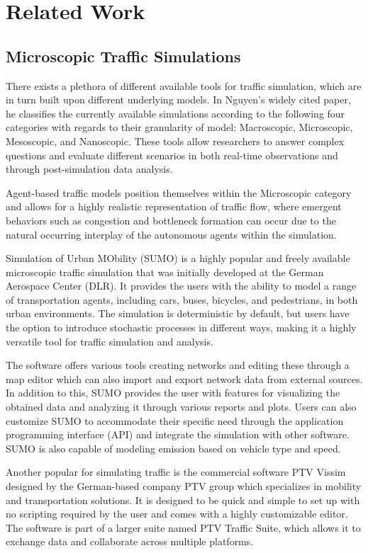 \section{Related Work} \label{Section_ref}
    \subsection{Microscopic Traffic Simulations}
        There exists a plethora of different available tools for traffic simulation, which are in turn built upon different underlying models. In Nguyen’s widely cited paper, he classifies the currently available simulations according to the following four categories with regards to their granularity of model: Macroscopic, Microscopic, Mesoscopic, and Nanoscopic. These tools allow researchers to answer complex questions and evaluate different scenarios in both real-time observations and through post-simulation data analysis.

        Agent-based traffic models position themselves within the Microscopic category and allows for a highly realistic representation of traffic flow, where emergent behaviors such as congestion and bottleneck formation can occur due to the natural occurring interplay of the autonomous agents within the simulation. 

        Simulation of Urban MObility (SUMO) is a highly popular and freely available microscopic traffic simulation that was initially developed at the German Aerospace Center (DLR). It provides the users with the ability to model a range of transportation agents, including cars, buses, bicycles, and pedestrians, in both urban environments. The simulation is deterministic by default, but users have the option to introduce stochastic processes in different ways, making it a highly versatile tool for traffic simulation and analysis.

        The software offers various tools creating networks and editing these through a map editor which can also import and export network data from external sources. In addition to this, SUMO provides the user with features for visualizing the obtained data and analyzing it through various reports and plots. Users can also customize SUMO to accommodate their specific need through the application programming interface (API) and integrate the simulation with other software. SUMO is also capable of modeling emission based on vehicle type and speed.

        Another popular for simulating traffic is the commercial software PTV Vissim designed by the German-based company PTV group which specializes in mobility and transportation solutions. It is designed to be quick and simple to set up with no scripting required by the user and comes with a highly customizable editor. The software is part of a larger suite named PTV Traffic Suite, which allows it to exchange data and collaborate across multiple platforms.


